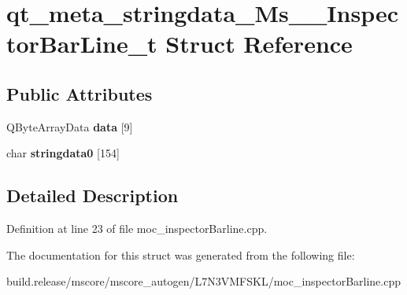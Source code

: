 \hypertarget{structqt__meta__stringdata___ms_____inspector_bar_line__t}{}\section{qt\+\_\+meta\+\_\+stringdata\+\_\+\+Ms\+\_\+\+\_\+\+Inspector\+Bar\+Line\+\_\+t Struct Reference}
\label{structqt__meta__stringdata___ms_____inspector_bar_line__t}
\subsection*{Public Attributes}
\begin{DoxyCompactItemize}
\item 
\mbox{\label{structqt__meta__stringdata___ms_____inspector_bar_line__t_a346734686f44fcb772624fe82758cc3e}} 
Q\+Byte\+Array\+Data {\bfseries data} \mbox{[}9\mbox{]}
\item 
\mbox{\label{structqt__meta__stringdata___ms_____inspector_bar_line__t_a21e041cc7157d0cd3e62d94bbab8d2ad}} 
char {\bfseries stringdata0} \mbox{[}154\mbox{]}
\end{DoxyCompactItemize}


\subsection{Detailed Description}


Definition at line 23 of file moc\+\_\+inspector\+Barline.\+cpp.



The documentation for this struct was generated from the following file\+:\begin{DoxyCompactItemize}
\item 
build.\+release/mscore/mscore\+\_\+autogen/\+L7\+N3\+V\+M\+F\+S\+K\+L/moc\+\_\+inspector\+Barline.\+cpp\end{DoxyCompactItemize}

